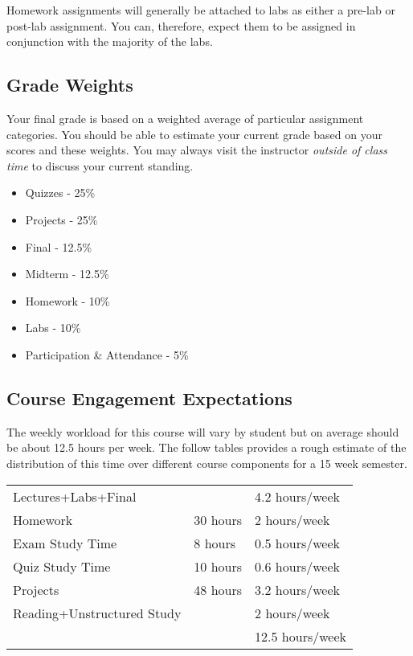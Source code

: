 \documentclass[10pt]{article}
\begin{document}
Homework assignments will generally be attached to labs as either a pre-lab or post-lab assignment. You can, therefore, expect them to be assigned in conjunction with the majority of the labs.


\subsection{Grade Weights}
Your final grade is based on a weighted average of particular assignment categories.  You should be able to estimate your current grade based on your scores and these weights.  You may always visit the instructor \textit{outside of class time} to discuss your current standing.  
\begin{itemize}
\item Quizzes - 25\%
\item Projects - 25\%
\item Final - 12.5\%
\item Midterm - 12.5\%
\item Homework - 10\%
\item Labs - 10\%
\item Participation \& Attendance - 5\%
\end{itemize} 


\subsection{Course Engagement Expectations}

The weekly workload for this course will vary by student but on average should be about 12.5 hours per week.  The follow tables provides a rough estimate of the distribution of this time over different course components for a 15 week semester. 
\begin{center}
\begin{tabular}{|l|l|l|}
\hline
Lectures+Labs+Final &      & 4.2 hours/week \\ 
Homework & 30 hours        & 2 hours/week \\
Exam Study Time & 8 hours  & 0.5 hours/week \\ 
Quiz Study Time & 10 hours & 0.6 hours/week \\
Projects & 48 hours        & 3.2 hours/week \\
Reading+Unstructured Study & & 2 hours/week \\
\hline 
& & 12.5 hours/week \\ 
\hline
\end{tabular}
\end{center}
\end{document}
